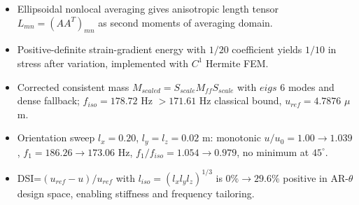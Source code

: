 \begin{itemize}
\item Ellipsoidal nonlocal averaging gives anisotropic length tensor $L_{mn}=(AA^T)_{mn}$ as second moments of averaging domain.
\item Positive-definite strain-gradient energy with $1/20$ coefficient yields $1/10$ in stress after variation, implemented with $C^1$ Hermite FEM.
\item Corrected consistent mass $M_{scaled}=S_{scale}M_{ff}S_{scale}$ with $eigs$ 6 modes and dense fallback; $f_{iso}=178.72$ Hz $>171.61$ Hz classical bound, $u_{ref}=4.7876$ $\mu$m.
\item Orientation sweep $l_x=0.20$, $l_y=l_z=0.02$ m: monotonic $u/u_0=1.00\to1.039$, $f_1=186.26\to173.06$ Hz, $f_1/f_{iso}=1.054\to0.979$, no minimum at $45^\circ$.
\item DSI=$(u_{ref}-u)/u_{ref}$ with $l_{iso}=(l_xl_yl_z)^{1/3}$ is $0\%\to29.6\%$ positive in AR-$\theta$ design space, enabling stiffness and frequency tailoring.
\end{itemize}
